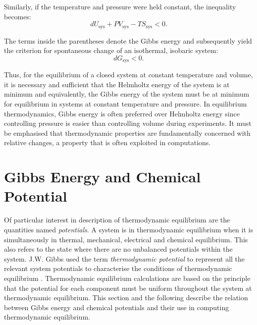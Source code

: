 		Similarly, if the temperature and pressure were held constant, the inequality becomes:
		\begin{equation}
			d{U_\text{sys} + PV_\text{sys} - TS_\text{sys} } < 0.
		\end{equation}

		The terms inside the parentheses denote the Gibbs energy and subsequently yield the criterion for spontaneous change of an isothermal, isobaric system:
		\begin{equation}
			d{G_\text{sys} } < 0.
		\end{equation}

		Thus, for the equilibrium of a closed system at constant temperature and volume, it is necessary and sufficient that the Helmholtz energy of the system is at minimum and equivalently, the Gibbs energy of the system must be at minimum for equilibrium in systems at constant temperature and pressure. In equilibrium thermodynamics, Gibbs energy is often preferred over Helmholtz energy since controlling pressure is easier than controlling volume during experiments. It must be emphasised that thermodynamic properties are fundamentally concerned with relative changes, a property that is often exploited in computations.

\section{Gibbs Energy and Chemical Potential}
	Of particular interest in description of  thermodynamic equilibrium are the quantities named \emph{potentials}. A system is in thermodynamic equilibrium when it is simultaneously in thermal, mechanical, electrical and chemical equilibrium. This also refers to the state where there are no unbalanced potentials within the system. J.W. Gibbs used the term \emph{thermodynamic potential} to represent all the relevant system potentials to characterise the conditions of thermodynamic equilibrium \cite{Gibbs:1878aa}. Thermodynamic equilibrium calculations are based on the principle that the potential for each component must be uniform throughout the system at thermodynamic equilibrium. This section and the following describe the relation between Gibbs energy and chemical potentials and their use in computing thermodynamic equilibrium.


